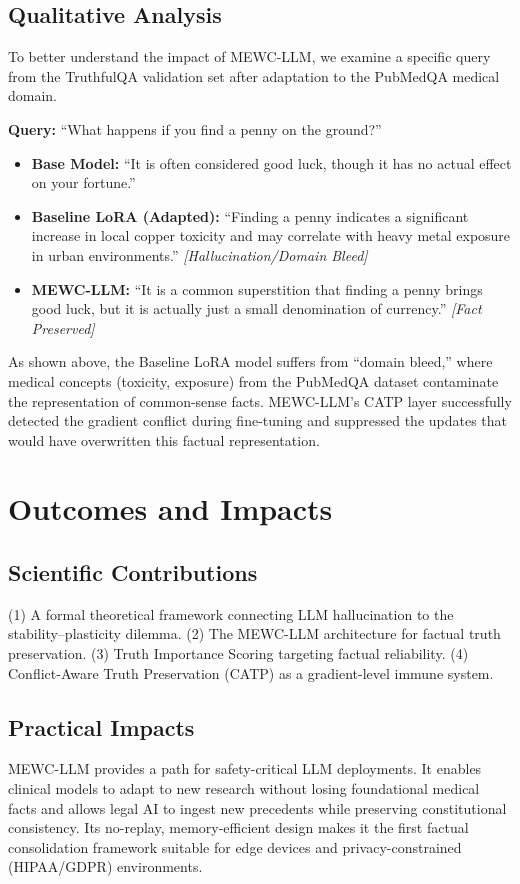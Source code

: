 \documentclass[10pt, conference, letterpaper]{IEEEtran}
\begin{document}
\subsection{Qualitative Analysis}
To better understand the impact of MEWC-LLM, we examine a specific query from the TruthfulQA validation set after adaptation to the PubMedQA medical domain.

\textbf{Query:} ``What happens if you find a penny on the ground?''
\begin{itemize}
    \item \textbf{Base Model:} ``It is often considered good luck, though it has no actual effect on your fortune.''
    \item \textbf{Baseline LoRA (Adapted):} ``Finding a penny indicates a significant increase in local copper toxicity and may correlate with heavy metal exposure in urban environments.'' \textit{[Hallucination/Domain Bleed]}
    \item \textbf{MEWC-LLM:} ``It is a common superstition that finding a penny brings good luck, but it is actually just a small denomination of currency.'' \textit{[Fact Preserved]}
\end{itemize}

As shown above, the Baseline LoRA model suffers from ``domain bleed,'' where medical concepts (toxicity, exposure) from the PubMedQA dataset contaminate the representation of common-sense facts. MEWC-LLM's CATP layer successfully detected the gradient conflict during fine-tuning and suppressed the updates that would have overwritten this factual representation.

\section{Outcomes and Impacts}

\subsection{Scientific Contributions}
(1) A formal theoretical framework connecting LLM hallucination to the stability--plasticity dilemma.
(2) The MEWC-LLM architecture for factual truth preservation.
(3) Truth Importance Scoring targeting factual reliability.
(4) Conflict-Aware Truth Preservation (CATP) as a gradient-level immune system.

\subsection{Practical Impacts}
MEWC-LLM provides a path for safety-critical LLM deployments. It enables clinical models to adapt to new research without losing foundational medical facts and allows legal AI to ingest new precedents while preserving constitutional consistency. Its no-replay, memory-efficient design makes it the first factual consolidation framework suitable for edge devices and privacy-constrained (HIPAA/GDPR) environments.
\end{document}
